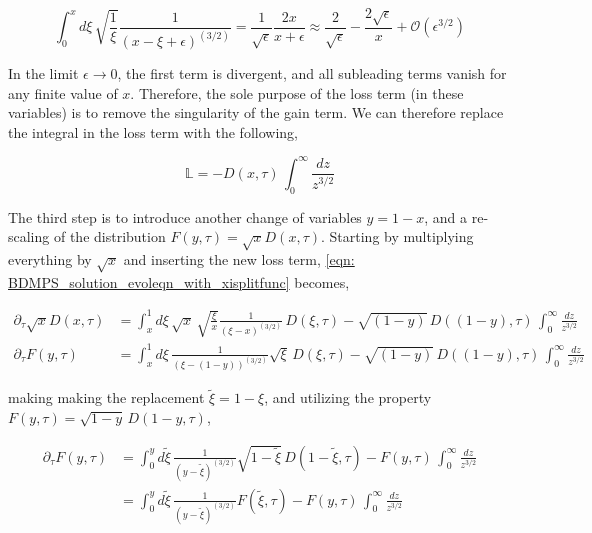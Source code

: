 \documentclass[main.tex]{subfiles}
\begin{document}
\begin{equation}
    \int_0^x d\xi \, \sqrt{\frac{1}{\xi}} \frac{1}{(x-\xi+\epsilon)^{(3/2)}} = \frac{1}{\sqrt{\epsilon}} \frac{2x}{x+\epsilon} \approx \frac{2}{\sqrt \epsilon} - \frac{2\sqrt{\epsilon}}{x} + \mathcal{O}(\epsilon^{3/2}) 
\end{equation}

In the limit \(\epsilon \rightarrow 0\), the first term is divergent, and all subleading terms vanish for any finite value of \(x\). Therefore, the sole purpose of the loss term (in these variables) is to remove the singularity of the gain term.  We can therefore replace the integral in the loss term with the following, 

\begin{equation}
    \mathbb{L} = - D(x,\tau) \, \int_0^\infty \frac{dz}{z^{3/2}}
\end{equation}

The third step is to introduce another change of variables \(y = 1-x\), and a re-scaling of the distribution \(F(y, \tau ) = \sqrt{x} D(x,\tau)\). Starting by multiplying everything by \(\sqrt{x}\) and inserting the new loss term, \autoref{eqn: BDMPS_solution_evoleqn_with_xisplitfunc} becomes,

\begin{align}\label{eqn: BDMPS_solution_evoleqn_with_F(y,tau)}
    \partial_\tau \sqrt{x} D(x,\tau) &= \int_x^1 d\xi \,\sqrt{x}\, \sqrt{\frac{\xi}{x}} \frac{1}{(\xi-x)^{(3/2)}} \,D(\xi, \tau) - \sqrt{(1-y)}\, D((1-y),\tau) \, \int_0^\infty \frac{dz}{z^{3/2}} \nonumber \\
    \partial_\tau F(y,\tau) &= \int_x^1 d\xi \, \frac{1}{(\xi-(1-y))^{(3/2)}} \sqrt{\xi} \,D(\xi, \tau) - \sqrt{(1-y)}\, D((1-y),\tau) \, \int_0^\infty \frac{dz}{z^{3/2}}
\end{align}

making making the replacement \(\tilde{\xi}  = 1- \xi\), and utilizing the property \(F(y, \tau ) = \sqrt{1-y} \,D(1-y,\tau)\),

\begin{align}\label{eqn: BDMPS_solution_evoleqn_Laplace_ready}
    \partial_\tau F(y,\tau) &= \int_0^{y} d\tilde{\xi} \, \frac{1}{(y-\tilde{\xi})^{(3/2)}} \sqrt{1-\tilde{\xi}} \,D(1-\tilde{\xi}, \tau) - F(y,\tau) \, \int_0^\infty \frac{dz}{z^{3/2}} \nonumber \\
    &= \int_0^{y} d\tilde{\xi} \, \frac{1}{(y-\tilde{\xi})^{(3/2)}} F(\tilde{\xi}, \tau) - F(y,\tau) \, \int_0^\infty \frac{dz}{z^{3/2}}
\end{align}
\end{document}
